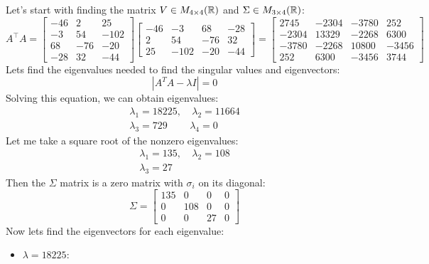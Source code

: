 \documentclass[12pt]{report}
\begin{document}
\begin{solution}
    Let's start with finding the matrix $V \in M_{4\times 4}(\mathbb{R})$ and $\Sigma \in M_{3\times 4}(\mathbb{R})$:
    \[
         A^\intercal A = \begin{bmatrix}
            -46 & 2 & 25 \\
            -3 & 54 & -102 \\
            68 & -76 & -20 \\
            -28 & 32 & -44
         \end{bmatrix}  \begin{bmatrix}
            -46 & -3 & 68 & -28\\
            2 & 54 & -76 & 32 \\
            25 & -102 & -20 & -44 
         \end{bmatrix} = \begin{bmatrix}
            2745  & -2304  & -3780  &  252 \\
           -2304  &  13329  & -2268  &  6300 \\
           -3780  & -2268  &  10800  & -3456 \\
            252  &  6300  & -3456  &  3744 
          \end{bmatrix}
    \]
    Lets find the eigenvalues needed to find the singular values and eigenvectors:
    \[
          |A^TA - \lambda I| = 0
    \]
    Solving this equation, we can obtain eigenvalues:
    \[
      \begin{array}{cc}
         \lambda_1 = 18225, & \ \lambda_2 = 11664 \\       
         \lambda_3 = 729 & \lambda_4 = 0  
      \end{array}
    \]
    Let me take a square root of the nonzero eigenvalues:
    \[
      \begin{array}{cc}
         \lambda_1 = 135, & \ \lambda_2 = 108 \\       
         \lambda_3 = 27  
      \end{array}
    \]
    Then the $\Sigma$ matrix is a zero matrix with $\sigma_i$ on its diagonal:  
    \[
         \Sigma = \begin{bmatrix}
            135 & 0 & 0 & 0\\
            0 & 108 & 0 & 0\\
            0 & 0 & 27 & 0
         \end{bmatrix}
    \]
    Now lets find the eigenvectors for each eigenvalue:
    \begin{itemize}
      \item $\lambda = 18225$:

\end{itemize}
\end{solution}
\end{document}
